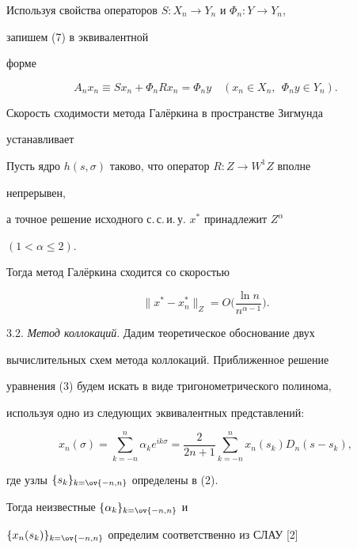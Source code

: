 Используя свойства операторов $S:X_n\to Y_n$ и $\Phi_n:Y\to Y_n$, 


запишем (7) в эквивалентной 


форме 


$$ 


A_n x_n\equiv S x_n+\Phi_n R x_n=\Phi_n y\quad 


(x_n\in X_n,\ \ \Phi_n y\in Y_n). 


$$ 


 


Скорость сходимости метода Гал\"еркина в пространстве Зигмунда 


устанавливает 


 


\begin{thm} 


Пусть ядро $h(s,\sigma)$ таково, что оператор $R:Z\to W^1Z$ вполне 


непрерывен, 


а точное решение исходного с.\,с.\,и.\,у. $x^*$ принадлежит $Z^\alpha$ 


$(1<\alpha\le2)$. 


Тогда метод Гал\"еркина сходится со скоростью 


$$ 


\|x^*-x^*_n\|_Z=O\bigg(\frac{\ln n}{n^{\alpha-1}} \bigg). 


$$ 


\end{thm} 


 


3.2. {\it Метод коллокаций}. Дадим теоретическое обоснование двух 


вычислительных схем метода коллокаций. Приближенное решение 


уравнения (3) будем искать в виде тригонометрического полинома, 


используя одно из следующих эквивалентных представлений: 


$$ 


x_n(\sigma)=\sum^n_{k=-n}\alpha_k e^{ik\sigma}=\frac{2}{2n+1} 


\sum^n_{k=-n}x_n(s_k)D_n(s-s_k), 


$$ 


где узлы $\{s_k\}_{k=\ov{-n,n}}$ определены в (2). 


Тогда неизвестные $\{\alpha_k\}_{k=\ov{-n,n}}$ и 


$\{x_n(s_k)\}_{k=\ov{-n,n}}$ определим соответственно из СЛАУ [2] 


